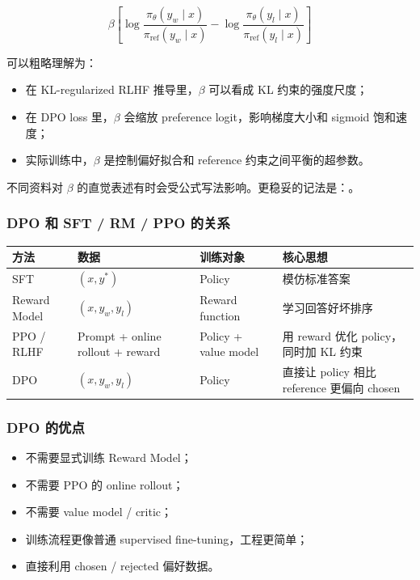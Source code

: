 \[
\beta
\left[
\log
\frac{\pi_\theta(y_w \mid x)}{\pi_\text{ref}(y_w \mid x)}
-
\log
\frac{\pi_\theta(y_l \mid x)}{\pi_\text{ref}(y_l \mid x)}
\right]
\]

可以粗略理解为：

\begin{itemize}[leftmargin=1.5em]
  \item 在 KL-regularized RLHF 推导里，$\beta$ 可以看成 KL 约束的强度尺度；
  \item 在 DPO loss 里，$\beta$ 会缩放 preference logit，影响梯度大小和 sigmoid 饱和速度；
  \item 实际训练中，$\beta$ 是控制偏好拟合和 reference 约束之间平衡的超参数。
\end{itemize}

不同资料对 $\beta$ 的直觉表述有时会受公式写法影响。更稳妥的记法是：。

\subsubsection{DPO 和 SFT / RM / PPO 的关系}

\begin{center}
{\small
\begin{tabular}{p{2.4cm}p{3.5cm}p{3.5cm}p{3.4cm}}
\hline
\textbf{方法} & \textbf{数据} & \textbf{训练对象} & \textbf{核心思想} \\
\hline
SFT
&
$(x, y^\ast)$
&
Policy
&
模仿标准答案
\\
Reward Model
&
$(x, y_w, y_l)$
&
Reward function
&
学习回答好坏排序
\\
PPO / RLHF
&
Prompt + online rollout + reward
&
Policy + value model
&
用 reward 优化 policy，同时加 KL 约束
\\
DPO
&
$(x, y_w, y_l)$
&
Policy
&
直接让 policy 相比 reference 更偏向 chosen
\\
\hline
\end{tabular}
}
\end{center}

\subsubsection{DPO 的优点}

\begin{itemize}[leftmargin=1.5em]
  \item 不需要显式训练 Reward Model；
  \item 不需要 PPO 的 online rollout；
  \item 不需要 value model / critic；
  \item 训练流程更像普通 supervised fine-tuning，工程更简单；
  \item 直接利用 chosen / rejected 偏好数据。
\end{itemize}

